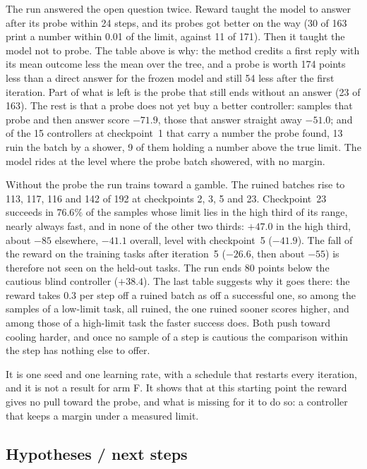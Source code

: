 \documentclass[11pt,a4paper]{article}
\begin{document}
The run answered the open question twice. Reward taught the model to answer
after its probe within 24 steps, and its probes got better on the way (30
of 163 print a number within 0.01 of the limit, against 11 of 171). Then it
taught the model not to probe. The table above is why: the method credits a
first reply with its mean outcome less the mean over the tree, and a probe
is worth 174 points less than a direct answer for the frozen model and
still 54 less after the first iteration. Part of what is left is the probe
that still ends without an answer (23 of 163). The rest is that a probe does
not yet buy a better controller: samples that probe and then answer score
$-71.9$, those that answer straight away $-51.0$; and of the 15 controllers
at checkpoint~1 that carry a number the probe found, 13 ruin the batch by a
shower, 9 of them holding a number above the true limit. The model rides at
the level where the probe batch showered, with no margin.

Without the probe the run trains toward a gamble. The ruined batches rise
to 113, 117, 116 and 142 of 192 at checkpoints 2, 3, 5 and 23. Checkpoint~23
succeeds in $76.6\%$ of the samples whose limit lies in the high third of
its range, nearly always fast, and in none of the other two thirds: $+47.0$
in the high third, about $-85$ elsewhere, $-41.1$ overall, level with
checkpoint~5 ($-41.9$). The fall of the reward on the training tasks after
iteration~5 ($-26.6$, then about $-55$) is therefore not seen on the
held-out tasks. The run ends 80 points below the cautious blind controller
($+38.4$). The last table suggests why it goes there: the reward takes 0.3
per step off a ruined batch as off a successful one, so among the samples of
a low-limit task, all ruined, the one ruined sooner scores higher, and among
those of a high-limit task the faster success does. Both push toward cooling
harder, and once no sample of a step is cautious the comparison within the
step has nothing else to offer.

It is one seed and one learning rate, with a schedule that restarts every
iteration, and it is not a result for arm F. It shows that at this starting
point the reward gives no pull toward the probe, and what is missing for it
to do so: a controller that keeps a margin under a measured limit.

\subsection*{Hypotheses / next steps}
\end{document}
